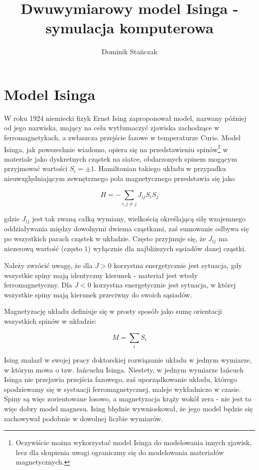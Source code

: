\documentclass[11pt]{article}
\title{Dwuwymiarowy model Isinga - symulacja komputerowa}
\author{Dominik Stańczak}
\begin{document}
\maketitle

\section{Model Isinga}

W roku 1924 niemiecki fizyk Ernst Ising zaproponował model, nazwany później od jego
nazwiska, mający na celu wytłumaczyć zjawiska zachodzące w ferromagnetykach, a zwłaszcza
przejście fazowe w temperaturze Curie. Model Isinga, jak powszechnie wiadomo,
opiera się na przedstawieniu spinów\footnote{Oczywiście można wykorzystać model
Isinga do modelowania innych zjawisk, lecz dla skupienia uwagi ograniczmy się
do modelowania materiałów magnetycznych.} w materiale jako dyskretnych cząstek
na siatce, obdarzonych spinem mogącym przyjmować wartości $S_i = \pm 1$.
Hamiltonian takiego układu w przypadku nieuwzględniającym zewnętrznego pola
magnetycznego przedstawia się jako

\[ H = -\sum_{i, j\neq j}{J_{ij} S_i S_j}\]

gdzie $J_{ij}$ jest tak zwaną całką wymiany, wielkością określającą siłę
wzajemnego oddziaływania między dowolnymi dwiema cząstkami, zaś sumowanie odbywa
się po wszystkich parach cząstek w układzie. Często przyjmuje się, że $J_{ij}$ ma
niezerową wartość (często $1$) wyłącznie dla najbliższych sąsiadów danej cząstki.

Należy zwrócić uwagę, że dla $J>0$ korzystna energetycznie jest sytuacja, gdy
wszystkie spiny mają identyczny kierunek - materiał jest wtedy ferromagnetyczny.
Dla $J<0$ korzystna energetycznie jest sytuacja, w której wszystkie spiny mają kierunek
przeciwny do swoich sąsiadów.

Magnetyzację układu definiuje się w prosty sposób jako sumę orientacji wszystkich
spinów w układzie:

\[M = \sum_i{S_i}\]

Ising znalazł w swojej pracy doktorskiej rozwiązanie układu w jednym wymiarze,
w którym mowa o tzw. łańcuchu Isinga. Niestety, w jednym wymiarze łańcuch Isinga
nie przejawia przejścia fazowego, zaś uporządkowanie układu, którego spodziewamy
się w systuacji ferromagnetycznej, maleje wykładniczo w czasie. Spiny są więc
zorientowane losowo, a magnetyzacja krąży wokół zera - nie jest to więc dobry model
magnesu. Ising błędnie wywnioskował, że jego model będzie się zachowywał podobnie w dowolnej liczbie wymiarów.
\end{document}

